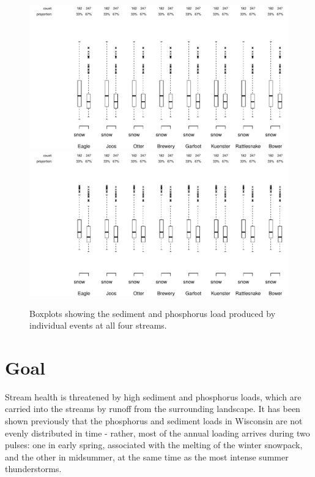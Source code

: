 \documentclass[10pt]{article}
\begin{document}
\begin{figure}[h]
    \begin{center}
\includegraphics{loadings-boxplot_stot}
    \vspace{15mm}
\includegraphics{loadings-boxplot_ptot}
    \caption{Boxplots showing the sediment and phosphorus load produced by individual events at all four streams.\label{boxplots}}
    \end{center}
\end{figure}










    
    



\section{Goal}
Stream health is threatened by high sediment and phosphorus loads, which are carried into the streams by runoff from the surrounding landscape. It has been shown previously\cite{Danz:2010} that the phosphorus and sediment loads in Wisconsin are not evenly distributed in time - rather, most of the annual loading arrives during two pulses: one in early spring, associated with the melting of the winter snowpack, and the other in midsummer, at the same time as the most intense summer thunderstorms.\\
\end{document}
